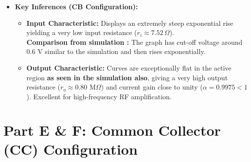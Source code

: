 \documentclass[11pt,a4paper]{article}
\begin{document}
\begin{itemize}
\begin{itemize}
        \item \textbf{Measured CB Gain ($\alpha_{exp}$):} \textbf{$\alpha = 0.9975$ as it should be less than 1}
    \end{itemize}
    \item \textbf{Key Inferences (CB Configuration):}
    \begin{itemize}
        \item \textbf{Input Characteristic:} Displays an extremely steep exponential rise yielding a very low input resistance (\textbf{$r_i \approx 7.52\,\Omega$}).\\
          \textbf{Comparison from simulation : } The graph has cut-off voltage around 0.6 V similar to the simulation and then rises exponentially.
        \item \textbf{Output Characteristic:} Curves are exceptionally flat in the active region \textbf{as seen in the simulation also}, giving a very high output resistance (\textbf{$r_o \approx 0.80\text{ M}\Omega$}) and current gain close to unity (\textbf{$\alpha = 0.9975 < 1$}). Excellent for high-frequency RF amplification.
    \end{itemize}
\end{itemize}

\clearpage

\section{Part E \& F: Common Collector (CC) Configuration}
\end{document}
